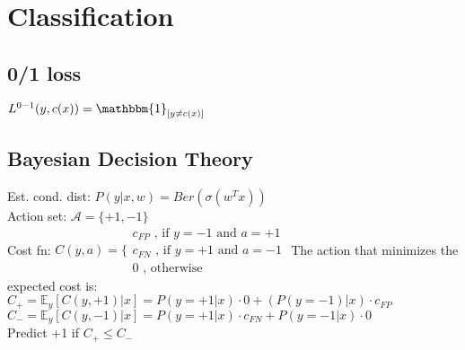 \section{Classification}
\subsection*{0/1 loss}
$L^{0-1}(y,c(x)) = \mathbbm{1}_{[y \neq c(x)]}$

\subsection*{Bayesian Decision Theory}
Est. cond. dist: $P(y|x,w) = Ber(\sigma(w^Tx))$\\
Action set: $\mathcal{A} = \{ +1, -1\}$\\
Cost fn: $C(y,a) = \{ 
\begin{array}{lr}
	c_{FP} \text{ , if $y=-1$ and $a=+1$}\\
	c_{FN} \text{ , if $y=+1$ and $a=-1$}\\
	0 \text{ , otherwise}
\end{array}
$
The action that minimizes the expected cost is:\\
$C_+ = \mathbb{E}_y[C(y,+1)|x] = P(y=+1|x) \cdot 0 + (P(y=-1)|x) \cdot c_{FP}$\\
$C_- = \mathbb{E}_y[C(y,-1)|x] = P(y=+1|x) \cdot c_{FN} + P(y=-1|x) \cdot 0$\\
Predict +1 if $C_+ \leq C_-$
